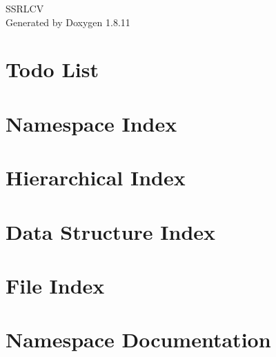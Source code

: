 \documentclass[twoside]{book}
\newcommand{\+}{\discretionary{\mbox{\scriptsize$\hookleftarrow$}}{}{}}
\newcommand{\clearemptydoublepage}{%
  \newpage{\pagestyle{empty}\cleardoublepage}%
}
\begin{document}
\hypersetup{pageanchor=false,
             bookmarksnumbered=true,
             pdfencoding=unicode
            }
\begin{titlepage}
\vspace*{7cm}
\begin{center}%
{\Large S\+S\+R\+L\+CV }\\
\vspace*{1cm}
{\large Generated by Doxygen 1.8.11}\\
\end{center}
\end{titlepage}
\clearemptydoublepage
\tableofcontents
\clearemptydoublepage
{}
\hypersetup{pageanchor=true}

\chapter{Todo List}
\label{todo}
\hypertarget{todo}{}

\chapter{Namespace Index}

\chapter{Hierarchical Index}

\chapter{Data Structure Index}

\chapter{File Index}

\chapter{Namespace Documentation}







\end{document}
